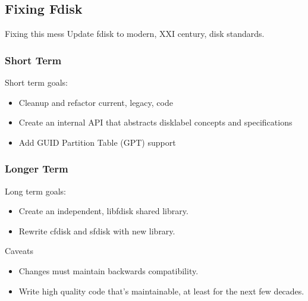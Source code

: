 \subsection{Fixing Fdisk}
\begin{frame}
  \begin{block}{Fixing this mess}
    Update fdisk to modern, XXI century, disk standards.
  \end{block}
\end{frame}

\begin{frame}\frametitle{Short Term}
  Short term goals:
  \begin{itemize}
  \item Cleanup and refactor current, legacy, code
  \item Create an internal API that abstracts disklabel concepts and specifications
  \item Add GUID Partition Table (GPT) support
  \end{itemize}
\end{frame}

\begin{frame}\frametitle{Longer Term}
  Long term goals:
  \begin{itemize}
  \item Create an independent, libfdisk shared library.
  \item Rewrite cfdisk and sfdisk with new library.
  \end{itemize}
\end{frame}

\begin{frame}
  \begin{block}{Caveats}
    \begin{itemize}
    \item Changes must maintain backwards compatibility.
    \item Write high quality code that's maintainable, at least for the next few decades.
    \end{itemize}
  \end{block}
\end{frame}
